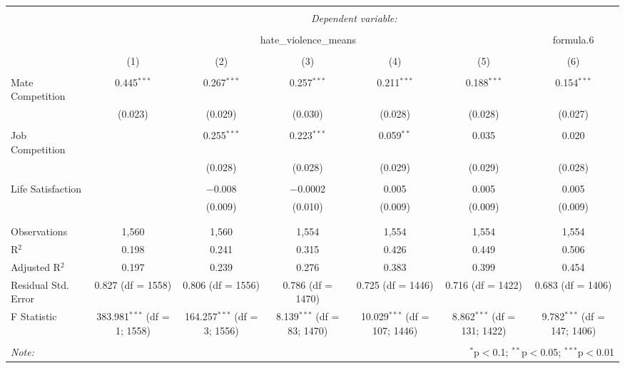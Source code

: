 
\begin{table}[!htbp] \centering 
  \caption{} 
  \label{} 
\begin{tabular}{@{\extracolsep{5pt}}lcccccc} 
\\[-1.8ex]\hline 
\hline \\[-1.8ex] 
 & \multicolumn{6}{c}{\textit{Dependent variable:}} \\ 
\cline{2-7} 
\\[-1.8ex] & \multicolumn{5}{c}{hate\_violence\_means} & formula.6 \\ 
\\[-1.8ex] & (1) & (2) & (3) & (4) & (5) & (6)\\ 
\hline \\[-1.8ex] 
 Mate Competition & 0.445$^{***}$ & 0.267$^{***}$ & 0.257$^{***}$ & 0.211$^{***}$ & 0.188$^{***}$ & 0.154$^{***}$ \\ 
  & (0.023) & (0.029) & (0.030) & (0.028) & (0.028) & (0.027) \\ 
  & & & & & & \\ 
 Job Competition &  & 0.255$^{***}$ & 0.223$^{***}$ & 0.059$^{**}$ & 0.035 & 0.020 \\ 
  &  & (0.028) & (0.028) & (0.029) & (0.029) & (0.028) \\ 
  & & & & & & \\ 
 Life Satisfaction &  & $-$0.008 & $-$0.0002 & 0.005 & 0.005 & 0.005 \\ 
  &  & (0.009) & (0.010) & (0.009) & (0.009) & (0.009) \\ 
  & & & & & & \\ 
\hline \\[-1.8ex] 
Observations & 1,560 & 1,560 & 1,554 & 1,554 & 1,554 & 1,554 \\ 
R$^{2}$ & 0.198 & 0.241 & 0.315 & 0.426 & 0.449 & 0.506 \\ 
Adjusted R$^{2}$ & 0.197 & 0.239 & 0.276 & 0.383 & 0.399 & 0.454 \\ 
Residual Std. Error & 0.827 (df = 1558) & 0.806 (df = 1556) & 0.786 (df = 1470) & 0.725 (df = 1446) & 0.716 (df = 1422) & 0.683 (df = 1406) \\ 
F Statistic & 383.981$^{***}$ (df = 1; 1558) & 164.257$^{***}$ (df = 3; 1556) & 8.139$^{***}$ (df = 83; 1470) & 10.029$^{***}$ (df = 107; 1446) & 8.862$^{***}$ (df = 131; 1422) & 9.782$^{***}$ (df = 147; 1406) \\ 
\hline 
\hline \\[-1.8ex] 
\textit{Note:}  & \multicolumn{6}{r}{$^{*}$p$<$0.1; $^{**}$p$<$0.05; $^{***}$p$<$0.01} \\ 
\end{tabular} 
\end{table} 
